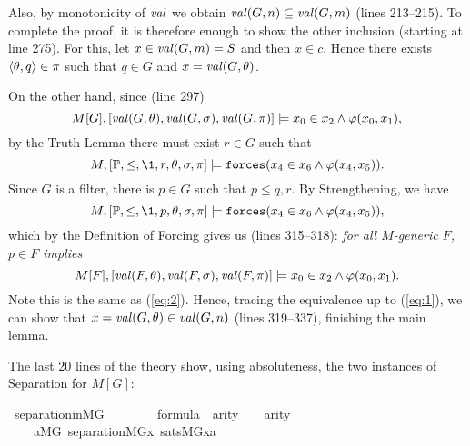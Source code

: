 Also, by monotonicity of $\operatorname{\mathit{val}}$ we obtain 
  $\operatorname{\mathit{val}}(G,n)\subseteq \operatorname{\mathit{val}}(G,m)$ (lines 213--215).
To complete the proof, it is therefore enough to show the other
inclusion (starting at line 275).
For this, let $x\in \operatorname{\mathit{val}}(G,m) = S$ and then $x\in c$. Hence there exists
$\langle\theta,q\rangle\in\pi$ such that $q\in G$ and $x=\operatorname{\mathit{val}}(G,\theta)$. 

On the other hand, since (line 297)
\[
M[G],[\operatorname{\mathit{val}}(G,\theta),\operatorname{\mathit{val}}(G,\sigma),\operatorname{\mathit{val}}(G,\pi)]\models
 x_0\in x_2\wedge\varphi( x_0, x_1),
\]
by the  Truth Lemma there must exist $r\in G$ such that
\[
M,[\PP,\leq,\1,r,\th,\sig,\pi]\models
\forceisa(x_4\in x_6\y\phi( x_4, x_5)).
\]
Since $G$ is a filter, there is $p\in G$ such that $p\leq q, r$.
By Strengthening, we have
\[
M,[\PP,\leq,\1,p,\th,\sig,\pi]\models
\forceisa(x_4\in x_6\y \phi( x_4, x_5)),
\]
which by the Definition of Forcing gives us (lines 315--318): \emph{for all $M$-generic $F$,
  $p\in F$ implies} 
\[
M[F],[\operatorname{\mathit{val}}(F,\theta),\operatorname{\mathit{val}}(F,\sigma),\operatorname{\mathit{val}}(F,\pi)]\models
 x_0\in  x_2 \wedge\varphi( x_0, x_1).
\]
Note this is the same as (\ref{eq:2}). Hence, tracing the equivalence
up to (\ref{eq:1}), we can show that $x=\operatorname{\mathit{val}}(G,\theta)\in \operatorname{\mathit{val}}(G,n)$
(lines 319--337), finishing the main lemma.

The last 20 lines of the theory show, using absoluteness, the two
instances of Separation for $M[G]$:

\begin{isabelle}
\isamarkupfalse%
\ separation{\isacharunderscore}in{\isacharunderscore}MG{\isacharcolon}\isanewline
\ \ \ \isanewline
\ \ \ \ {\isachardoublequoteopen}{\isasymphi}{\isasymin}formula{\isachardoublequoteclose}\ \ {\isachardoublequoteopen}arity{\isacharparenleft}{\isasymphi}{\isacharparenright}\ {\isacharequal}\ {}\ {\isasymor}\ arity{\isacharparenleft}{\isasymphi}{\isacharparenright}{\isacharequal}{}{\isachardoublequoteclose}\isanewline
\ \ \ \ \isanewline
\ \ \ \ {\isachardoublequoteopen}{\isacharparenleft}{\isasymforall}a{\isasymin}{\isacharparenleft}M{\isacharbrackleft}G{\isacharbrackright}{\isacharparenright}{\isachardot}\ separation{\isacharparenleft}{\isacharhash}{\isacharhash}M{\isacharbrackleft}G{\isacharbrackright}{\isacharcomma}{\isasymlambda}x{\isachardot}\ sats{\isacharparenleft}M{\isacharbrackleft}G{\isacharbrackright}{\isacharcomma}{\isasymphi}{\isacharcomma}{\isacharbrackleft}x{\isacharcomma}a{\isacharbrackright}{\isacharparenright}{\isacharparenright}{\isacharparenright}{\isachardoublequoteclose}
\end{isabelle}
   
